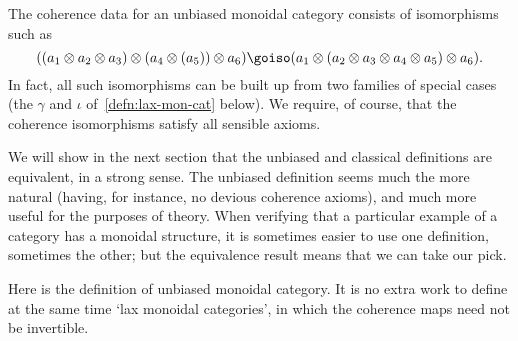 The coherence data for an unbiased monoidal category consists of
isomorphisms such as
\[
((a_1 \otimes a_2 \otimes a_3) \otimes (a_4 \otimes (a_5)) \otimes a_6)
\goiso
(a_1 \otimes (a_2 \otimes a_3 \otimes a_4 \otimes a_5) \otimes a_6).
\]
In fact, all such isomorphisms can be built up from two families of special
cases (the $\gamma$ and $\iota$ of~\ref{defn:lax-mon-cat} below).  We
require, of course, that the coherence isomorphisms satisfy all sensible
axioms.

We will show in the next section that the unbiased and classical
definitions are equivalent, in a strong sense.  The unbiased definition
seems much the more natural (having, for instance, no devious coherence
axioms), and much more useful for the purposes of theory.  When verifying
that a particular example of a category has a monoidal structure, it is
sometimes easier to use one definition, sometimes the other; but the
equivalence result means that we can take our pick.

Here is the definition of unbiased monoidal category.  It is no extra work
to define at the same time `lax monoidal categories', in which the
coherence maps need not be invertible. 

